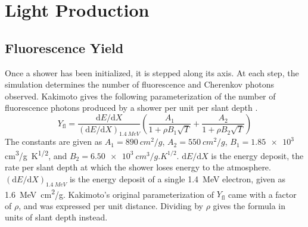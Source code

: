 \section{Light Production} \label{sec:light_prod}

\subsection{Fluorescence Yield} \label{sec:fluorescence}

Once a shower has been initialized, it is stepped along its axis. At each step, the simulation determines the number of fluorescence and Cherenkov photons observed. Kakimoto gives the following parameterization of the number of fluorescence photons produced by a shower per unit per slant depth \cite{kakimoto1996yield}.
\begin{equation} \label{eq:fluorescence}
    Y_\text{fl} = \frac{\text{d}E / \text{d}X}{(\text{d}E / \text{d}X)_{\SI{1.4}{MeV}}}
        \left(\frac{A_1}{1 + \rho B_1 \sqrt{T}} + \frac{A_2}{1 + \rho B_2 \sqrt{T}}\right)
\end{equation}
The constants are given as $A_1 = \SI{890}{cm^2/g}$, $A_2 = \SI{550}{cm^2/g}$, $B_1 = \num{1.85e3}$ \si{cm^3/g.K^{1/2}}, and $B_2 = \SI{6.50e3}{cm^3/g.K^{1/2}}$. $\text{d}E / \text{d}X$ is the energy deposit, the rate per slant depth at which the shower loses energy to the atmosphere. $(\text{d}E / \text{d}X)_{\SI{1.4}{MeV}}$ is the energy deposit of a single \SI{1.4}{MeV} electron, given as \SI{1.6}{MeV.cm^2/g}. Kakimoto's original parameterization of $Y_\text{fl}$ came with a factor of $\rho$, and was expressed per unit distance. Dividing by $\rho$ gives the formula in units of slant depth instead.

